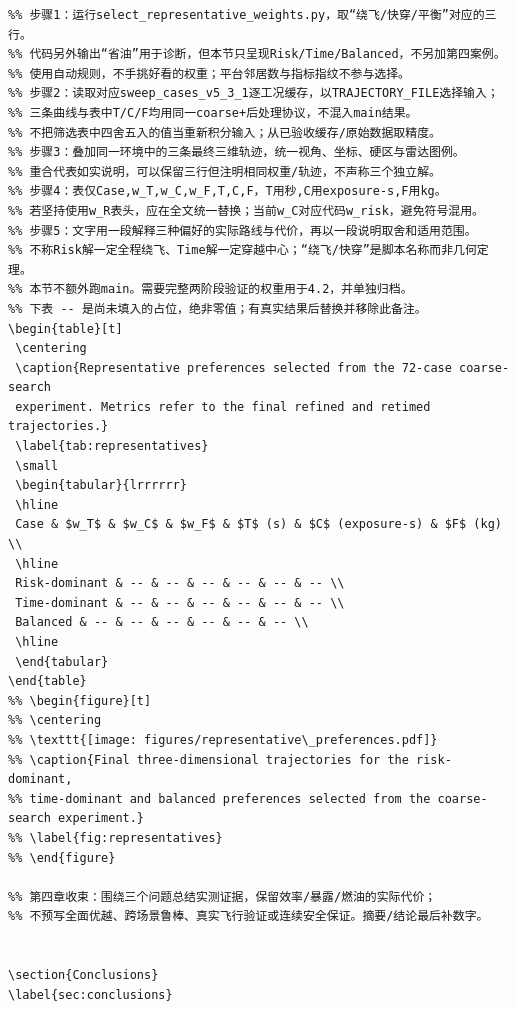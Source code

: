 \documentclass[12pt]{article}
\begin{document}
\begin{verbatim}
%% 步骤1：运行select_representative_weights.py，取“绕飞/快穿/平衡”对应的三行。
%% 代码另外输出“省油”用于诊断，但本节只呈现Risk/Time/Balanced，不另加第四案例。
%% 使用自动规则，不手挑好看的权重；平台邻居数与指标指纹不参与选择。
%% 步骤2：读取对应sweep_cases_v5_3_1逐工况缓存，以TRAJECTORY_FILE选择输入；
%% 三条曲线与表中T/C/F均用同一coarse+后处理协议，不混入main结果。
%% 不把筛选表中四舍五入的值当重新积分输入；从已验收缓存/原始数据取精度。
%% 步骤3：叠加同一环境中的三条最终三维轨迹，统一视角、坐标、硬区与雷达图例。
%% 重合代表如实说明，可以保留三行但注明相同权重/轨迹，不声称三个独立解。
%% 步骤4：表仅Case,w_T,w_C,w_F,T,C,F，T用秒,C用exposure-s,F用kg。
%% 若坚持使用w_R表头，应在全文统一替换；当前w_C对应代码w_risk，避免符号混用。
%% 步骤5：文字用一段解释三种偏好的实际路线与代价，再以一段说明取舍和适用范围。
%% 不称Risk解一定全程绕飞、Time解一定穿越中心；“绕飞/快穿”是脚本名称而非几何定理。
%% 本节不额外跑main。需要完整两阶段验证的权重用于4.2，并单独归档。
%% 下表 -- 是尚未填入的占位，绝非零值；有真实结果后替换并移除此备注。
\begin{table}[t]
 \centering
 \caption{Representative preferences selected from the 72-case coarse-search
 experiment. Metrics refer to the final refined and retimed trajectories.}
 \label{tab:representatives}
 \small
 \begin{tabular}{lrrrrrr}
 \hline
 Case & $w_T$ & $w_C$ & $w_F$ & $T$ (s) & $C$ (exposure-s) & $F$ (kg) \\
 \hline
 Risk-dominant & -- & -- & -- & -- & -- & -- \\
 Time-dominant & -- & -- & -- & -- & -- & -- \\
 Balanced & -- & -- & -- & -- & -- & -- \\
 \hline
 \end{tabular}
\end{table}
%% \begin{figure}[t]
%% \centering
%% \texttt{[image: figures/representative\_preferences.pdf]}
%% \caption{Final three-dimensional trajectories for the risk-dominant,
%% time-dominant and balanced preferences selected from the coarse-search experiment.}
%% \label{fig:representatives}
%% \end{figure}

%% 第四章收束：围绕三个问题总结实测证据，保留效率/暴露/燃油的实际代价；
%% 不预写全面优越、跨场景鲁棒、真实飞行验证或连续安全保证。摘要/结论最后补数字。


\section{Conclusions}
\label{sec:conclusions}


\end{verbatim}
\end{document}
